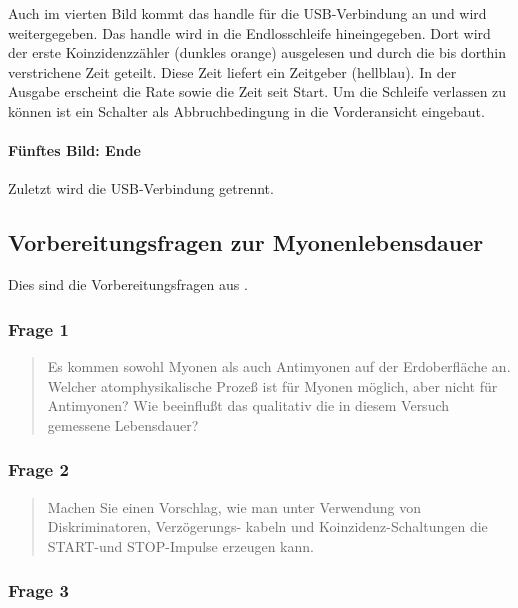 \documentclass[11pt, ngerman, fleqn, DIV=15, headinclude, BCOR=2cm]{scrreprt}
\begin{document}
Auch im vierten Bild kommt das handle für die USB-Verbindung an und wird
weitergegeben. Das handle wird in die Endlosschleife hineingegeben. Dort wird
der erste Koinzidenzzähler (dunkles orange) ausgelesen und durch die bis
dorthin verstrichene Zeit geteilt. Diese Zeit liefert ein Zeitgeber (hellblau).
In der Ausgabe erscheint die Rate sowie die Zeit seit Start. Um die Schleife
verlassen zu können ist ein Schalter als Abbruchbedingung in die Vorderansicht
eingebaut.

\paragraph{Fünftes Bild: Ende}

Zuletzt wird die USB-Verbindung getrennt.

\subsection{Vorbereitungsfragen zur Myonenlebensdauer}

Dies sind die Vorbereitungsfragen aus \parencite[14]{physik512-Anleitung}.

\subsubsection{Frage 1}

\begin{quote}
    Es kommen sowohl Myonen als auch Antimyonen auf der Erdoberfläche an.
    Welcher atomphysikalische Prozeß ist für Myonen möglich, aber nicht für
    Antimyonen? Wie beeinflußt das qualitativ die in diesem Versuch gemessene
    Lebensdauer?
\end{quote}


\subsubsection{Frage 2}

\begin{quote}
    Machen Sie einen Vorschlag, wie man unter Verwendung von Diskriminatoren,
    Verzögerungs- kabeln und Koinzidenz-Schaltungen die START-und STOP-Impulse
    erzeugen kann.
\end{quote}


\subsubsection{Frage 3}
\end{document}
